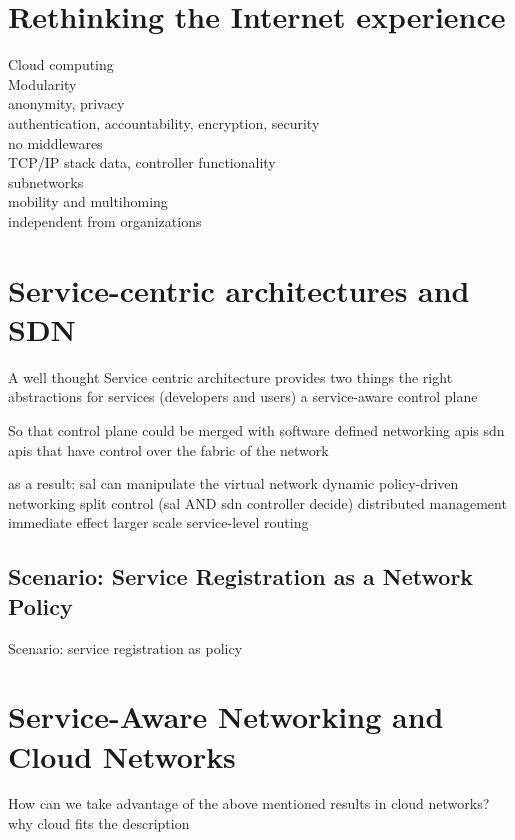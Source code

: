 \documentclass[12pt,a4paper,oneside]{article}
\begin{document}
\section{Rethinking the Internet experience}
Cloud computing
\\Modularity
\\anonymity, privacy
\\authentication, accountability, encryption, security
\\no middlewares
\\TCP/IP stack data, controller functionality
\\subnetworks
\\mobility and multihoming
\\independent from organizations

\newpage
\section{Service-centric architectures and SDN}
A well thought Service centric architecture provides two things
the right abstractions for services (developers and users)
a service-aware control plane

So that control plane could be merged with software defined networking apis
sdn apis that have control over the fabric of the network

as a result: sal can manipulate the virtual network
dynamic policy-driven networking
split control (sal AND sdn controller decide)
distributed management
immediate effect
larger scale service-level routing

\subsection{Scenario: Service Registration as a Network Policy}
Scenario:
service registration as policy

\newpage
\section{Service-Aware Networking and Cloud Networks}
How can we take advantage of the above mentioned results in cloud networks?
why cloud fits the description

\newpage
\end{document}
